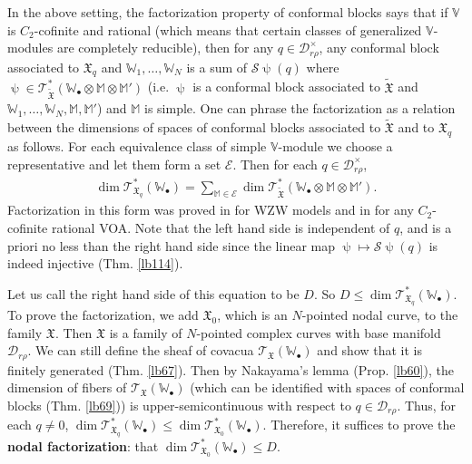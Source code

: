 \documentclass[12pt,a4paper,notitlepage]{report}
\theoremstyle{definition}
\theoremstyle{plain}
\newcommand{\fk}{\mathfrak}
\newcommand{\mc}{\mathcal}
\newcommand{\wtd}{\widetilde}
\newcommand{\scr}{\mathscr}
\newcommand{\blt}{\bullet}
\newcommand{\Vbb}{\mathbb V}
\newcommand{\Wbb}{\mathbb W}
\newcommand{\Mbb}{\mathbb M}
\numberwithin{equation}{section}
\begin{document}
In the above setting, the factorization property of conformal blocks says that if $\Vbb$ is $C_2$-cofinite and rational (which means that certain classes of generalized $\Vbb$-modules are completely reducible), then  for any $q\in\mc D_{r\rho}^\times$, any conformal block associated to $\fk X_q$ and $\Wbb_1,\dots,\Wbb_N$ is a sum of $\mc S\uppsi(q)$ where $\uppsi\in\scr T_{\wtd{\fk X}}^*(\Wbb_\blt\otimes\Mbb\otimes\Mbb')$ (i.e. $\uppsi$ is a conformal block associated to $\wtd{\fk X}$ and $\Wbb_1,\dots,\Wbb_N,\Mbb,\Mbb'$) and $\Mbb$ is simple.  One can phrase the factorization as a relation between the dimensions of spaces of conformal blocks associated to $\wtd{\fk X}$ and to $\fk X_q$ as follows. For each equivalence class of simple $\Vbb$-module we choose a representative and let them form a set $\mc E$. Then for each $q\in\mc D_{r\rho}^\times$,
\begin{align*}
\dim\scr T_{\fk X_q}^*(\Wbb_\blt)=\sum_{\Mbb\in\mc E}\dim \scr T_{\wtd{\fk X}}^*(\Wbb_\blt\otimes\Mbb\otimes\Mbb').
\end{align*}
Factorization in this form was proved in \cite{TUY89} for WZW models and in \cite{DGT19b} for any $C_2$-cofinite rational VOA. Note that the left hand side is independent of $q$, and is a priori no less than the right hand side since the linear map $\uppsi\mapsto\mc S\uppsi(q)$ is indeed injective (Thm. \ref{lb114}).


Let us call the right hand side of this equation to be $D$. So $D\leq \dim\scr T_{\fk X_q}^*(\Wbb_\blt)$. To prove the factorization, we add $\fk X_0$, which is an $N$-pointed nodal curve, to the family $\fk X$. Then $\fk X$ is a family of $N$-pointed complex curves with base manifold $\mc D_{r\rho}$. We can still define the sheaf of covacua $\scr T_{\fk X}(\Wbb_\blt)$ and show that it is finitely generated (Thm. \ref{lb67}). Then by Nakayama's lemma (Prop. \ref{lb60}), the dimension of fibers of $\scr T_{\fk X}(\Wbb_\blt)$ (which can be identified with spaces of conformal blocks (Thm. \ref{lb69})) is upper-semicontinuous with respect to $q\in \mc D_{r\rho}$. Thus, for each $q\neq 0$, $\dim\scr T_{\fk X_q}^*(\Wbb_\blt)\leq \dim\scr T_{\fk X_0}^*(\Wbb_\blt)$. Therefore, it suffices to prove the \textbf{nodal factorization}:  that $\dim\scr T_{\fk X_0}^*(\Wbb_\blt)\leq D$.
\end{document}
